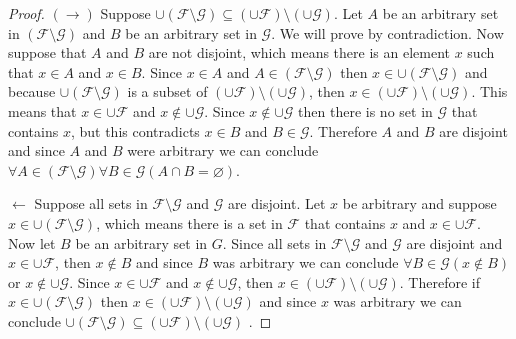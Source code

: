 \documentclass{article}
\newcommand{\F}{\mathcal{F}}
\newcommand{\G}{\mathcal{G}}
\begin{document}
\begin{proof} 
$(\rightarrow)$ Suppose $\cup ( \F \setminus \G) \subseteq (\cup \F) \setminus (\cup \G)$. Let $A$ be an arbitrary set in $(\F \setminus \G)$ and $B$ be an arbitrary set in $\G$. We will prove by contradiction. Now suppose that $A$ and $B$ are not disjoint, which means there is an element $x$ such that $x \in A$ and $x \in B$. Since $x \in A$ and $A \in (\F \setminus \G)$ then $x \in \cup (\F \setminus \G)$ and because $\cup (\F \setminus \G)$ is a subset of $(\cup \F) \setminus (\cup\G)$, then $x \in (\cup \F) \setminus (\cup \G)$. This means that $x \in \cup \F$ and $x \notin \cup \G$. Since $x \notin \cup \G$ then there is no set in $\G$ that contains $x$, but this contradicts $x \in B$ and $B \in \G$. Therefore $A$ and $B$ are disjoint and since $A$ and $B$ were arbitrary we can conclude $\forall A \in (\F \setminus \G) \forall B \in \G (A \cap B = \varnothing)$.

$\leftarrow$ Suppose all sets in $\F \setminus \G$ and $\G$ are disjoint. Let $x$ be arbitrary and suppose $x \in \cup(\F \setminus \G)$, which means there is a set in $\F$ that contains $x$ and $x \in \cup \F$. Now let $B$ be an arbitrary set in $G$. Since all sets in $\F \setminus \G$ and $\G$ are disjoint and $x \in \cup \F$, then $x \notin B$ and since $B$ was arbitrary we can conclude $\forall B \in \G(x \notin B)$ or $x \notin \cup \G$. Since $x \in \cup \F$ and $x \notin \cup \G$, then $x \in (\cup \F) \setminus (\cup \G)$. Therefore if $x \in \cup(\F \setminus \G)$ then $x \in ( \cup \F) \setminus (\cup \G)$ and since $x$ was arbitrary we can conclude  $\cup ( \F \setminus \G) \subseteq (\cup \F) \setminus (\cup \G)$ .
\end{proof}
\end{document}
